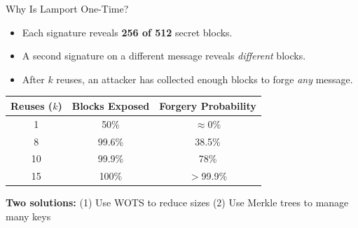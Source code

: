 \documentclass[aspectratio=169, 10pt]{beamer}
\begin{document}
\begin{frame}{Why Is Lamport One-Time?}
\begin{itemize}
    \item Each signature reveals \textbf{256 of 512} secret blocks.
    \item A second signature on a different message reveals \emph{different} blocks.
    \item After \(k\) reuses, an attacker has collected enough blocks to forge \emph{any} message.
\end{itemize}

\vspace{8pt}
\begin{center}
\begin{tabular}{ccc}
\toprule
\textbf{Reuses ($k$)} & \textbf{Blocks Exposed} & \textbf{Forgery Probability} \\
\midrule
1 & 50\% & $\approx 0\%$ \\
8 & 99.6\% & 38.5\% \\
10 & 99.9\% & 78\% \\
15 & 100\% & $>$99.9\% \\
\bottomrule
\end{tabular}
\end{center}

\vspace{4pt}
\centering
\textbf{Two solutions:} \quad (1) Use WOTS to reduce sizes \quad (2) Use Merkle trees to manage many keys
\end{frame}
\end{document}
